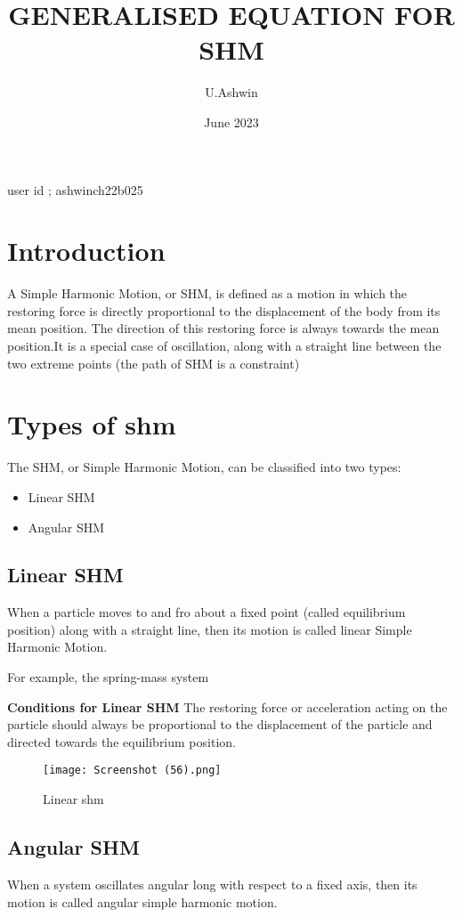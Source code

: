 \documentclass{article}
\title{GENERALISED EQUATION FOR SHM}
\author{U.Ashwin }
\date{June 2023}
\begin{document}
\maketitle
\begin{center}
    user id ; ashwinch22b025
\end{center}
\section{Introduction}\cite{morin2008introduction}
A Simple Harmonic Motion, or SHM, is defined as a motion in which the restoring                    force is directly proportional to the displacement of the body from its mean position. The direction of this restoring force is always towards the mean position.It is a special case of oscillation, along with a straight line between the two extreme points (the path of SHM is a constraint)
\section{Types of shm}
The SHM, or Simple Harmonic Motion, can be classified into two types:
\begin{itemize}
    \item Linear SHM
    \item Angular SHM
\end{itemize}
\subsection{Linear SHM}
When a particle moves to and fro about a fixed point (called equilibrium position) along with a straight line, then its motion is called linear Simple Harmonic Motion.

For example, the spring-mass system

\textbf{Conditions for Linear SHM}
The restoring force or acceleration acting on the particle should always be proportional to the displacement of the particle and directed towards the equilibrium position.
\begin{figure}[h!]
    \centering
    \texttt{[image: Screenshot (56).png]}
    \caption{Linear shm}
    \label{fig:enter-label}
\end{figure}

\subsection{Angular SHM}
When a system oscillates angular long with respect to a fixed axis, then its motion is called angular simple harmonic motion.
\end{document}
